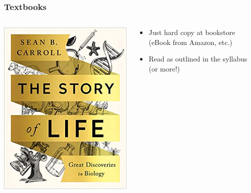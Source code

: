 \documentclass[10pt]{beamer}
\begin{document}
\begin{frame}
\frametitle{Textbooks}

	\begin{columns}
		\begin{column}{0.3\textwidth}
			\begin{center}
				\includegraphics[width=1.0\textwidth]{figures/carroll.jpg}
			\end{center}	
		\end{column}
		
		\begin{column}{0.7\textwidth}
			\begin{itemize}
				\item Just hard copy at bookstore (eBook from Amazon, etc.)
				\vspace{0.25cm}
				\item Read as outlined in the syllabus (or more!)
			\end{itemize}
		\end{column}
	\end{columns}
\end{frame}
\end{document}
